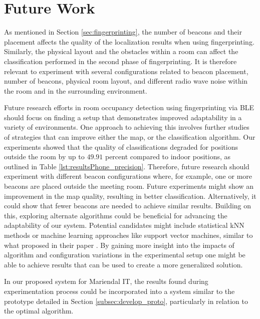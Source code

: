 \chapter{Future Work}
As mentioned in Section \ref{sec:fingerprinting}, the number of beacons and their placement affects the quality of the localization results when using fingerprinting. 
Similarly, the physical layout and the obstacles within a room can affect the classification performed in the second phase of fingerprinting. 
It is therefore relevant to experiment with several configurations related to beacon placement, number of beacons, physical room layout, and different radio wave noise within the room and in the surrounding environment. 

Future research efforts in room occupancy detection using fingerprinting via BLE should focus on finding a setup that demonstrates improved adaptability in a variety of environments.
One approach to achieving this involves further studies of strategies that can improve either the map, or the classification algorithm.
Our experiments showed that the quality of classifications degraded for positions outside the room by up to $49.91$ percent compared to indoor positions, as outlined in Table \ref{lst:resultsPhone_precision}.
Therefore, future research should experiment with different beacon configurations where, for example, one or more beacons are placed outside the meeting room. 
Future experiments might show an improvement in the map quality, resulting in better classification. Alternatively, it could show that fewer beacons are needed to achieve similar results.
Building on this, exploring alternate algorithms could be beneficial for advancing the adaptability of our system.
Potential candidates might include statistical kNN methods or machine learning approaches like support vector machines, similar to what \citeauthor{ble_kneares_neural} proposed in their paper \cite{ble_kneares_neural}. 
By gaining more insight into the impacts of algorithm and configuration variations in the experimental setup one might be able to achieve results that can be used to create a more generalized solution.

In our proposed system for Mariendal IT, the results found during experimentation process could be incorporated into a system similar to the prototype detailed in Section \ref{subsec:develop_proto},
particularly in relation to the optimal algorithm.

